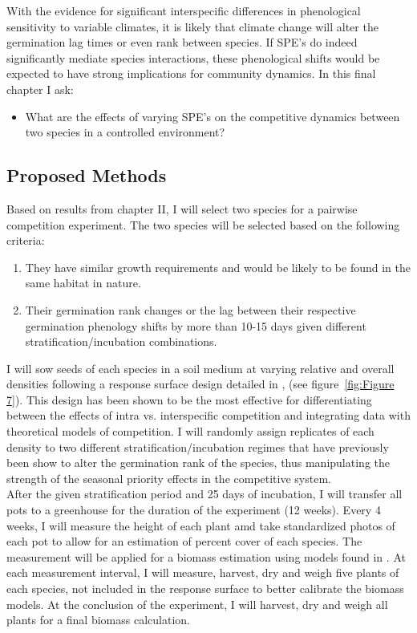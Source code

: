 \documentclass{article}\usepackage[]{graphicx}\usepackage[]{color}
\begin{document}
\indent With the evidence for significant interspecific differences in phenological sensitivity to variable climates, it is likely that climate change will alter the germination lag times or even rank between species. If SPE's do indeed significantly mediate species interactions, these phenological shifts would be expected to have strong implications for community dynamics. In this final chapter I ask:
\begin{itemize}
\item What are the effects of varying SPE's on the competitive dynamics between two species in a controlled environment?
\end{itemize}
\subsection*{Proposed Methods}
\indent\indent Based on results from chapter II, I will select two species for a pairwise competition experiment. The two species will be selected based on the following criteria:
\begin{enumerate}
\item They have similar growth requirements and would be likely to be found in the same habitat in nature.
\item Their germination rank changes or the lag between their respective germination phenology shifts by more than 10-15 days given different stratification/incubation combinations.
\end{enumerate}
\indent\indent I will sow seeds of each species in a soil medium at varying relative and overall densities following a response surface design detailed in \cite{Inouye2001}, (see figure~\ref{fig:Figure 7}). This design has been shown to be the most effective for differentiating between the effects of intra vs. interspecific competition and integrating data with theoretical models of competition. I will randomly assign replicates of each density to two different stratification/incubation regimes that have previously been show to alter the germination rank of the species, thus manipulating the strength of the seasonal priority effects in the competitive system.\\
\indent After the given stratification period and 25 days of incubation, I will transfer all pots to a greenhouse for the duration of the experiment (12 weeks). Every 4 weeks, I will measure the height of each plant amd take standardized photos of each pot to allow for an estimation of percent cover of each species. The measurement will be applied for a biomass estimation using models found in \citet{Axmanova2012}. At each measurement interval, I will measure, harvest, dry and weigh five plants of each species, not included in the response surface to better calibrate the biomass models. At the conclusion of the experiment, I will harvest, dry and weigh all plants for a final biomass calculation.\\
\end{document}
